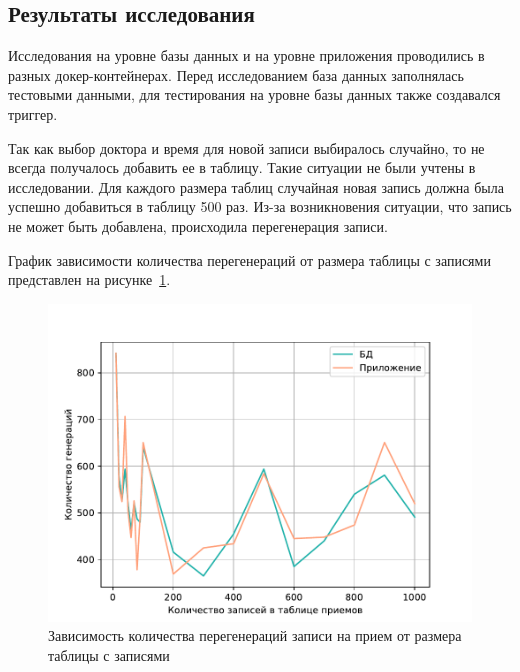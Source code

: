 \subsection{Результаты исследования}
Исследования на уровне базы данных и на уровне приложения проводились в разных докер-контейнерах. Перед исследованием база данных заполнялась тестовыми данными, для тестирования на уровне базы данных также создавался триггер.

Так как выбор доктора и время для новой записи выбиралось случайно, то не всегда получалось добавить ее в таблицу. Такие ситуации не были учтены в исследовании. Для каждого размера таблиц случайная новая запись должна была успешно добавиться в таблицу 500 раз. Из-за возникновения ситуации, что запись не может быть добавлена, происходила перегенерация записи.

График зависимости количества перегенераций от размера таблицы с записями представлен на рисунке~\ref{errors}.
\begin{figure}[!h]
	\centering
	\includegraphics[width=160mm]{image/errors}
	\caption{Зависимость количества перегенераций записи на прием от размера таблицы с записями}
	\label{errors}
\end{figure}

